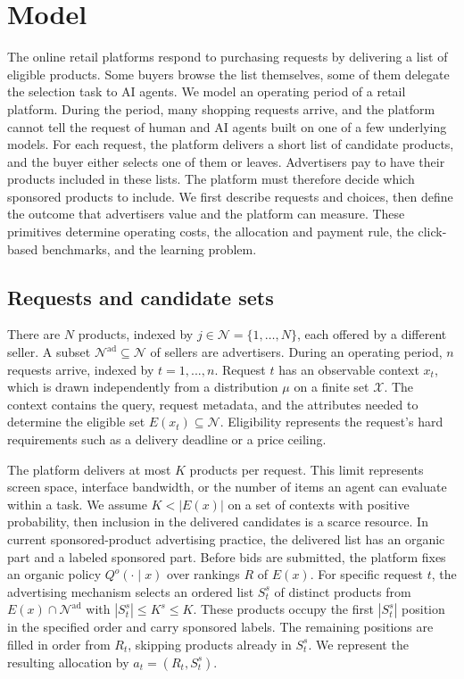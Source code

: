 \documentclass[opre,dblanonrev]{informs4}
\providecommand{\1}{\mathbf{1}}
\begin{document}
\section{Model}\label{sec:model}

The online retail platforms respond to purchasing requests by delivering a list of eligible products. Some buyers browse the list themselves, some of them delegate the selection task to AI agents. We model an operating period of a retail platform. During the period, many shopping requests arrive, and the platform cannot tell the request of human and AI agents built on one of a few underlying models. For each request, the platform delivers a short list of candidate products, and the buyer either selects one of them or leaves. Advertisers pay to have their products included in these lists. The platform must therefore decide which sponsored products to include. We first describe requests and choices, then define the outcome that advertisers value and the platform can measure. These primitives determine operating costs, the allocation and payment rule, the click-based benchmarks, and the learning problem.

\subsection{Requests and candidate sets}\label{sec:model-requests}

There are $N$ products, indexed by $j\in\mathcal N=\{1,\ldots,N\}$, each offered by a different seller. A subset $\mathcal N^{\mathrm{ad}}\subseteq\mathcal N$ of sellers are advertisers. During an operating period, $n$ requests arrive, indexed by $t = 1, ..., n$. Request $t$ has an observable context $x_t$, which is drawn independently from a distribution $\mu$ on a finite set $\mathcal X$. The context contains the query, request metadata, and the attributes needed to determine the eligible set $E(x_t)\subseteq\mathcal N$. Eligibility represents the request's hard requirements such as a delivery deadline or a price ceiling.

The platform delivers at most $K$ products per request. This limit represents screen space, interface bandwidth, or the number of items an agent can evaluate within a task. We assume $K<|E(x)|$ on a set of contexts with positive probability, then inclusion in the delivered candidates is a scarce resource. In current sponsored-product advertising practice, the delivered list has an organic part and a labeled sponsored part. Before bids are submitted, the platform fixes an organic policy $Q^o(\cdot\mid x)$ over rankings $R$ of $E(x)$. For specific request $t$, the advertising mechanism selects an ordered list $S_t^s$ of distinct products from $E(x)\cap\mathcal N^{\mathrm{ad}}$ with $|S_t^s| \le K^s\le K$. These products occupy the first $|S_t^s|$ position in the specified order and carry sponsored labels. The remaining positions are filled in order from $R_t$, skipping products already in $S_t^s$. We represent the resulting allocation by $a_t=(R_t,S_t^s)$.
\end{document}

